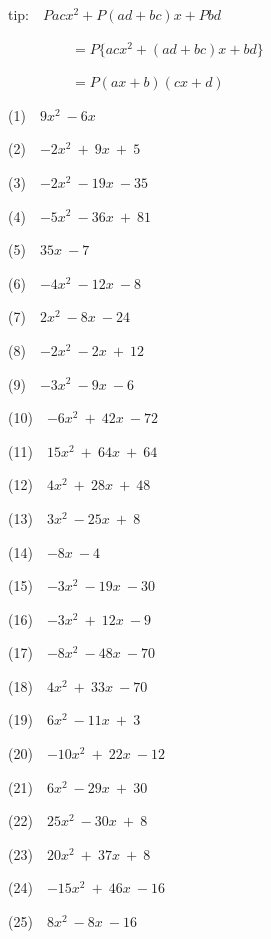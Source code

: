 \documentclass[a4j,twocolumn,10pt,fleqn]{jarticle}
\begin{document}
tip:~~$Pacx^2 + P(ad + bc)x + Pbd$

~~~~~~~~~$= P\{acx^2 + (ad + bc)x +bd\}$

~~~~~~~~~$= P(ax + b)(cx + d)$

(1)~~$9x^2~-6x$

(2)~~$-2x^2~+~9x~+~5$

(3)~~$-2x^2~-19x~-35$

(4)~~$-5x^2~-36x~+~81$

(5)~~$35x~-7$

(6)~~$-4x^2~-12x~-8$

(7)~~$2x^2~-8x~-24$

(8)~~$-2x^2~-2x~+~12$

(9)~~$-3x^2~-9x~-6$

(10)~~$-6x^2~+~42x~-72$

(11)~~$15x^2~+~64x~+~64$

(12)~~$4x^2~+~28x~+~48$

(13)~~$3x^2~-25x~+~8$

(14)~~$-8x~-4$

(15)~~$-3x^2~-19x~-30$

(16)~~$-3x^2~+~12x~-9$

(17)~~$-8x^2~-48x~-70$

(18)~~$4x^2~+~33x~-70$

(19)~~$6x^2~-11x~+~3$

(20)~~$-10x^2~+~22x~-12$

(21)~~$6x^2~-29x~+~30$

(22)~~$25x^2~-30x~+~8$

(23)~~$20x^2~+~37x~+~8$

(24)~~$-15x^2~+~46x~-16$

(25)~~$8x^2~-8x~-16$
\end{document}
